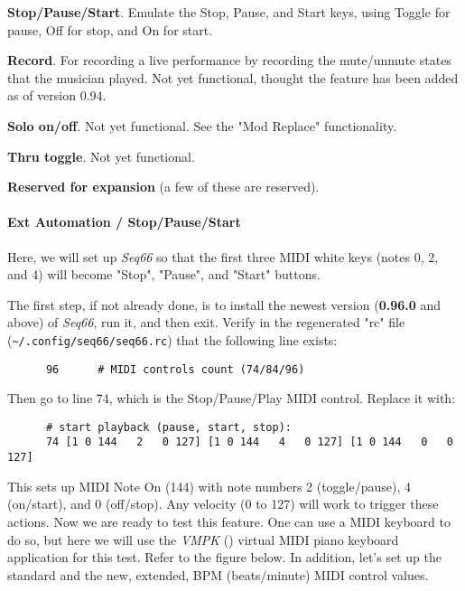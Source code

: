       \begin{enumber}
         \item \textbf{Stop/Pause/Start}.  Emulate the Stop, Pause, and
            Start keys, using Toggle for pause, Off for stop, and On for
            start.
         \item \textbf{Record}.  For recording a live performance by
            recording the mute/unmute states that the musician played.
            Not yet functional, thought the feature has been added as of
            version 0.94.
         \item \textbf{Solo on/off}.
            Not yet functional.  See the "Mod Replace" functionality.
         \item \textbf{Thru toggle}.
            Not yet functional.
         \item \textbf{Reserved for expansion} (a few of these are reserved).
      \end{enumber}

\paragraph{Ext Automation / Stop/Pause/Start}
\label{paragraph:rc_file_midi_ctrl_ex_stopps}

   Here, we will set up \textsl{Seq66} so that the first three MIDI
   white keys (notes 0, 2, and 4) will become "Stop", "Pause", and "Start"
   buttons.

   The first step, if not already done, is to install the newest version
   (\textbf{0.96.0} and above) of \textsl{Seq66},
   run it, and then exit.
   Verify in the regenerated "rc" file
   (\texttt{\textasciitilde/.config/seq66/seq66.rc}) that the
   following line exists:

   \begin{verbatim}
      96      # MIDI controls count (74/84/96)
   \end{verbatim}

   Then go to line 74, which is the Stop/Pause/Play MIDI control.
   Replace it with:

   \begin{verbatim}
      # start playback (pause, start, stop):
      74 [1 0 144   2   0 127] [1 0 144   4   0 127] [1 0 144   0   0 127]
   \end{verbatim}

   This sets up MIDI Note On (144) with note numbers 2 (toggle/pause),
   4 (on/start), and 0 (off/stop).
   Any velocity (0 to 127) will work to trigger these actions.
   Now we are ready to test this feature.  One can use a MIDI keyboard to do
   so, but here we will use the \textsl{VMPK} (\cite{vmpk}) virtual MIDI
   piano keyboard application for this test.  Refer to the figure below.
   In addition, let's set up the standard and the new, extended, BPM
   (beats/minute) MIDI control values.  

